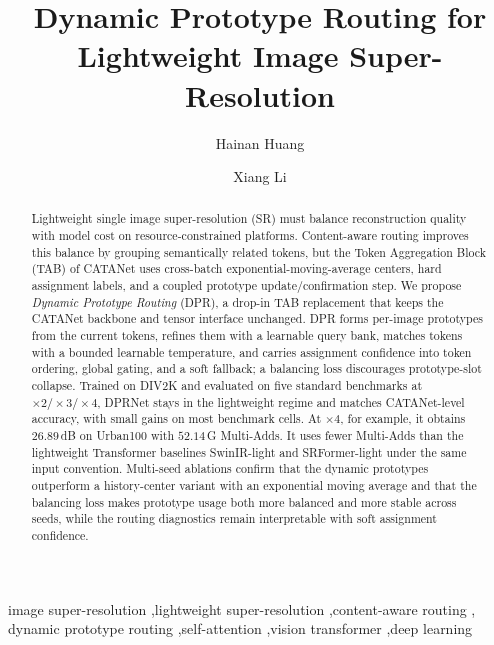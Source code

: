 \documentclass[preprint,12pt]{elsarticle}
\begin{document}
\begin{frontmatter}

\title{Dynamic Prototype Routing for Lightweight Image Super-Resolution}

\author[a]{Hainan Huang}
\author[a]{Xiang Li}



\begin{abstract}
Lightweight single image super-resolution (SR) must balance reconstruction quality with
model cost on resource-constrained platforms. Content-aware routing improves this balance
by grouping semantically related tokens, but the Token Aggregation Block (TAB) of CATANet
uses cross-batch exponential-moving-average centers, hard assignment labels, and a coupled
prototype update/confirmation step. We propose \emph{Dynamic Prototype Routing} (DPR), a
drop-in TAB replacement that keeps the CATANet backbone and tensor interface unchanged.
DPR forms per-image prototypes from the current tokens, refines them with a learnable
query bank, matches tokens with a bounded learnable temperature, and carries assignment
confidence into token ordering, global gating, and a soft fallback; a balancing loss
discourages prototype-slot collapse. Trained on DIV2K and evaluated on five standard
benchmarks at $\times2/\times3/\times4$, DPRNet stays in the lightweight regime and
matches CATANet-level accuracy, with small gains on most benchmark cells. At $\times4$,
for example, it obtains $26.89$\,dB on Urban100 with $52.14$\,G Multi-Adds. It uses fewer
Multi-Adds than the lightweight Transformer baselines SwinIR-light and SRFormer-light
under the same input convention. Multi-seed ablations confirm that the
dynamic prototypes outperform a history-center variant with an exponential moving average
and that the balancing loss makes prototype usage both more balanced and more stable across
seeds, while the routing diagnostics remain interpretable with soft assignment confidence.
\end{abstract}

\begin{keyword}
image super-resolution \sep lightweight super-resolution \sep content-aware routing \sep
dynamic prototype routing \sep self-attention \sep vision transformer \sep deep learning
\end{keyword}

\end{frontmatter}
\end{document}
